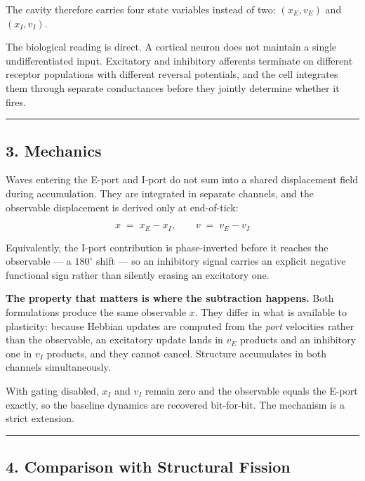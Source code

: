 \documentclass[
  11pt,
  a4paper,
]{article}
\begin{document}
The cavity therefore carries four state variables instead of two:
\((x_E, v_E)\) and \((x_I, v_I)\).

The biological reading is direct. A cortical neuron does not maintain a
single undifferentiated input. Excitatory and inhibitory afferents
terminate on different receptor populations with different reversal
potentials, and the cell integrates them through separate conductances
before they jointly determine whether it fires.

\begin{center}\rule{0.5\linewidth}{0.5pt}\end{center}

\subsection{3. Mechanics}\label{mechanics}

Waves entering the E-port and I-port do not sum into a shared
displacement field during accumulation. They are integrated in separate
channels, and the observable displacement is derived only at
end-of-tick:

\[
x \;=\; x_E - x_I, \qquad v \;=\; v_E - v_I
\]

Equivalently, the I-port contribution is phase-inverted before it
reaches the observable --- a \(180^\circ\) shift --- so an inhibitory
signal carries an explicit negative functional sign rather than silently
erasing an excitatory one.

\textbf{The property that matters is where the subtraction happens.}
Both formulations produce the same observable \(x\). They differ in what
is available to plasticity: because Hebbian updates are computed from
the \emph{port} velocities rather than the observable, an excitatory
update lands in \(v_E\) products and an inhibitory one in \(v_I\)
products, and they cannot cancel. Structure accumulates in both channels
simultaneously.

With gating disabled, \(x_I\) and \(v_I\) remain zero and the observable
equals the E-port exactly, so the baseline dynamics are recovered
bit-for-bit. The mechanism is a strict extension.

\begin{center}\rule{0.5\linewidth}{0.5pt}\end{center}

\subsection{4. Comparison with Structural
Fission}\label{comparison-with-structural-fission}
\end{document}
